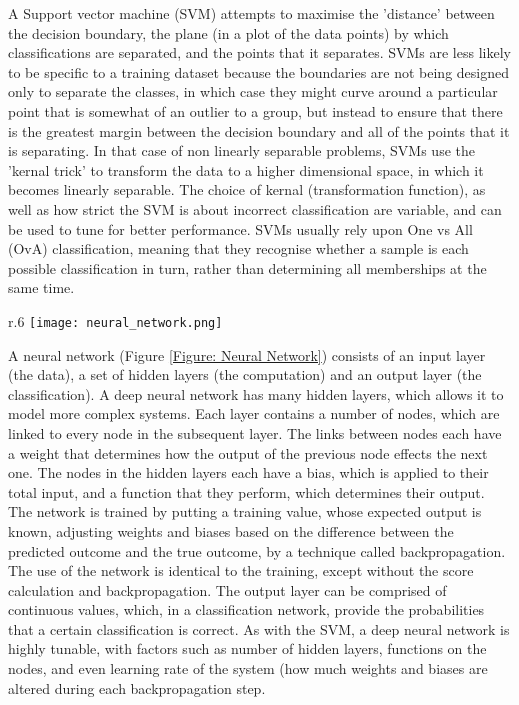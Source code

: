 \documentclass[12pt]{article}
\begin{document}
				A Support vector machine (SVM) attempts to maximise the 'distance' between the decision boundary, the plane (in a plot of the data points) by which classifications are separated, and the points that it separates.  SVMs are less likely to be specific to a training dataset because the boundaries are not being designed only to separate the classes, in which case they might curve around a particular point that is somewhat of an outlier to a group, but instead to ensure that there is the greatest margin between the decision boundary and all of the points that it is separating.  In that case of non linearly separable problems, SVMs use the 'kernal trick' to transform the data to a higher dimensional space, in which it becomes linearly separable.  The choice of kernal (transformation function), as well as how strict the SVM is about incorrect classification are variable, and can be used to tune for better performance.  SVMs usually rely upon One vs All (OvA) classification, meaning that they recognise whether a sample is each possible classification in turn, rather than determining all memberships at the same time.
		
		\begin{wrapfigure}{r}{.6\textwidth}
			\centering
			\texttt{[image: neural\_network.png]}
			\caption{A simple illustration of a neural network with 3 hidden layers.  Weights are applied on the connections between nodes, and biases are applied on the nodes themselves, before functions are applied}
			\label{Figure: Neural Network}
		\end{wrapfigure}
		
				A neural network (Figure \ref{Figure: Neural Network}) consists of an input layer (the data), a set of hidden layers (the computation) and an output layer (the classification).  A deep neural network has many hidden layers, which allows it to model more complex systems.  Each layer contains a number of nodes, which are linked to every node in the subsequent layer.  The links between nodes each have a weight that determines how the output of the previous node effects the next one.  The nodes in the hidden layers each have a bias, which is applied to their total input, and a function that they perform, which determines their output.  The network is trained by putting a training value, whose expected output is known,  adjusting weights and biases based on the difference between the predicted outcome and the true outcome, by a technique called backpropagation.  The use of the network is identical to the training, except without the score calculation and backpropagation.  The output layer can be comprised of continuous values, which, in a classification network, provide the probabilities that a certain classification is correct.  As with the SVM, a deep neural network is highly tunable, with factors such as number of hidden layers, functions on the nodes, and even learning rate of the system (how much weights and biases are altered during each backpropagation step.		
		
\end{document}
